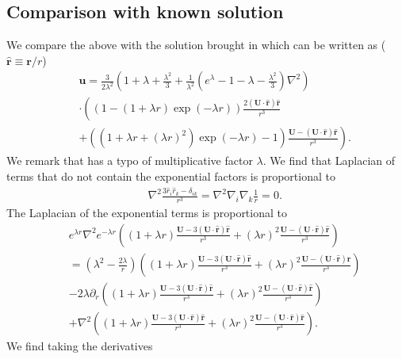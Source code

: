 \documentclass[aps,prx,twocolumn,amsmath,amssymb,amsfonts]{revtex4-2}
\begin{document}
{{\begin{appendices}
\subsection{Comparison with known solution}

We compare the above with the solution brought in \cite{kim} which can be written as ($\bm {\hat r}\equiv \bm r/r$)
\begin{eqnarray}&&
\bm u\!=\!\frac{3}{2\lambda^2}\left(1\!+\!\lambda\!+\!\frac{\lambda^2}{3}\!+\!\frac{1}{\lambda^2}\left(e^{\lambda}\!-\!1\!-\!\lambda\!-\!\frac{\lambda^2}{3}\right)\nabla^2\right)
\\&&
\cdot \left(\left(1-(1+\lambda r)\exp(-\lambda r)\right)\frac{2(\bm U\cdot \bm {\hat r})\bm {\hat r}}{r^3}
\right.\nonumber\\&&\left.
+ \left((1\!+\!\lambda r\!+\!(\lambda r)^2)\exp(-\lambda r)\!-\!1\right)\frac{\bm U\!-\!(\bm U\!\cdot\! \bm{\hat r})\bm{\hat r}}{r^3}\right).\nonumber
\end{eqnarray}
We remark that \cite{kim} has a typo of multiplicative factor $\lambda$. We find that Laplacian of terms that do not contain the exponential factors is proportional to
\begin{eqnarray}&&
\nabla^2\frac{3{\hat r_i}{\hat r_k}-\delta_{ik}}{r^3}=\nabla^2 \nabla_i\nabla_k \frac{1}{r}=0.
\end{eqnarray}
The Laplacian of the exponential terms is proportional to
\begin{eqnarray}&&
e^{\lambda r}\nabla^2 e^{-\lambda r} \left( (1\!+\!\lambda r)\frac{\bm U\!-\!3(\bm U\!\cdot\! \bm{\hat r})\bm{\hat r}}{r^3}
\!+\!(\lambda r)^2\frac{\bm U\!-\!(\bm U\!\cdot\! \bm{\hat r})\bm{\hat r}}{r^3}\right) \nonumber\\&&
=\left(\lambda^2-\frac{2\lambda}{r}\right) \left( (1\!+\!\lambda r)\frac{\bm U\!-\!3(\bm U\!\cdot\! \bm{\hat r})\bm{\hat r}}{r^3}
\!+\!(\lambda r)^2\frac{\bm U\!-\!(\bm U\!\cdot\! \bm{\hat r})\bm{\hat r}}{r^3}\right)\nonumber\\&&
-2\lambda  \partial_r \left( (1\!+\!\lambda r)\frac{\bm U\!-\!3(\bm U\!\cdot\! \bm{\hat r})\bm{\hat r}}{r^3}
\!+\!(\lambda r)^2\frac{\bm U\!-\!(\bm U\!\cdot\! \bm{\hat r})\bm{\hat r}}{r^3}\right)\nonumber\\&&
+\nabla^2 \left( (1\!+\!\lambda r)\frac{\bm U\!-\!3(\bm U\!\cdot\! \bm{\hat r})\bm{\hat r}}{r^3}
\!+\!(\lambda r)^2\frac{\bm U\!-\!(\bm U\!\cdot\! \bm{\hat r})\bm{\hat r}}{r^3}\right).
\end{eqnarray}
We find taking the derivatives
\begin{eqnarray}&&

\end{eqnarray}
\end{appendices}}}
\end{document}
